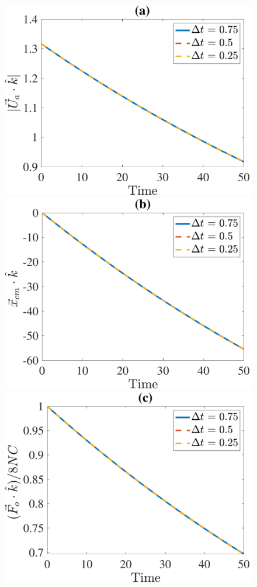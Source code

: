 \begin{figure}[ht]
	\begin{center}
		\includegraphics[scale=0.35]{./figures/fig_NC10_dt_Ua3_all}
		\includegraphics[scale=0.35]{./figures/fig_NC10_dt_cm3_all}
		\includegraphics[scale=0.35]{./figures/fig_NC10_dt_Fo3_all}

\end{center}
\end{figure}
